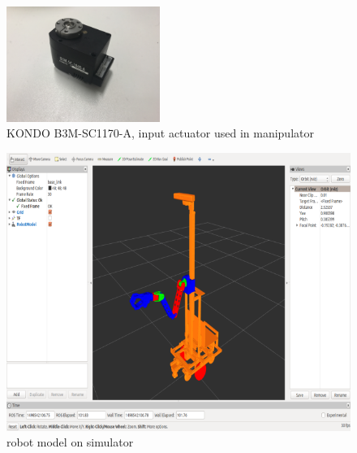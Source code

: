 \begin{figure}[!htbp]
\begin{center}
\includegraphics[width=5cm]{servo.jpg}
\caption{KONDO B3M-SC1170-A, input actuator used in manipulator}
\label{fig:servo}
\end{center}
\end{figure}

\begin{figure}[!htbp]
\begin{center}
\includegraphics[width=\columnwidth]{model.png}
\caption{robot model on simulator}
\label{fig:model}
\end{center}
\end{figure}
